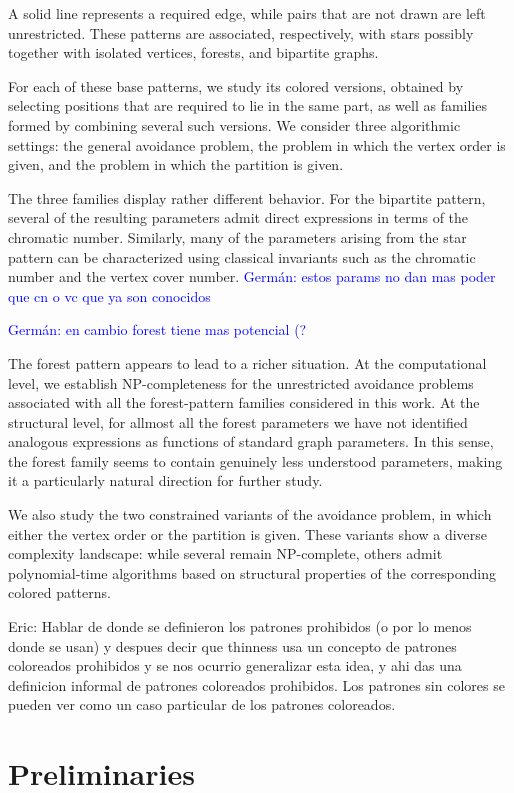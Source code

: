 \documentclass[12pt]{article}
\theoremstyle{plain}
\theoremstyle{definition}
\theoremstyle{remark}
\theoremstyle{definition}
\newcommand{\eric}[1]{%
  \textcolor{green!50!black}{Eric: #1}%
}
\newcommand{\german}[1]{%
  \textcolor{blue}{Germán: #1}%
}
\begin{document}
A solid line represents a required edge, while pairs that are not drawn
are left unrestricted. These patterns are associated, respectively, with
stars possibly together with isolated vertices, forests, and bipartite
graphs.

For each of these base patterns, we study its colored versions, obtained by
selecting positions that are required to lie in the same part, as well as
families formed by combining several such versions. We consider three
algorithmic settings: the general avoidance problem, the problem in which the
vertex order is given, and the problem in which the partition is given.

The three families display rather different behavior. For the bipartite
pattern, several of the resulting parameters admit direct expressions in
terms of the chromatic number. Similarly, many of the parameters arising
from the star pattern can be characterized using classical invariants such
as the chromatic number and the vertex cover number.
\german{estos params no dan mas poder que cn o vc que ya son conocidos}
\german{en cambio forest tiene mas potencial (?}

The forest pattern appears to lead to a richer situation. At the
computational level, we establish NP-completeness for the unrestricted
avoidance problems associated with all the forest-pattern families considered
in this work. At the structural level, for allmost all the forest parameters we have
not identified analogous expressions as functions of standard graph
parameters. In this sense, the forest family seems to contain genuinely less
understood parameters, making it a particularly natural direction for further
study.

We also study the two constrained variants of the avoidance problem, in
which either the vertex order or the partition is given. These variants show
a diverse complexity landscape: while several remain NP-complete, others
admit polynomial-time algorithms based on structural properties of the
corresponding colored patterns.



\eric{Hablar de donde se definieron los patrones prohibidos (o por lo menos donde se usan) y despues decir que thinness usa un concepto de patrones coloreados prohibidos y se nos ocurrio generalizar esta idea, y ahi das una definicion informal de patrones coloreados prohibidos. Los patrones sin colores se pueden ver como un caso particular de los patrones coloreados.}

\section{Preliminaries}\label{sec:preliminaries}
\end{document}
